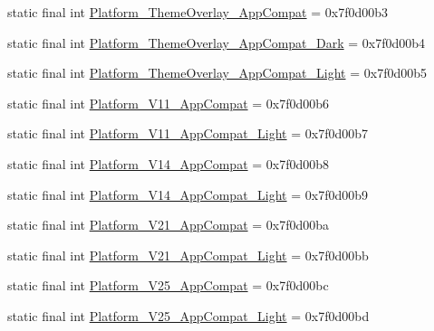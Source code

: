 \begin{DoxyCompactItemize}
\item 
static final int \mbox{\hyperlink{classandroid_1_1support_1_1v7_1_1appcompat_1_1R_1_1style_ad1eaa7488679a38de1c1d644df0440b0}{Platform\+\_\+\+Theme\+Overlay\+\_\+\+App\+Compat}} = 0x7f0d00b3
\item 
static final int \mbox{\hyperlink{classandroid_1_1support_1_1v7_1_1appcompat_1_1R_1_1style_ad5eb2d3e6c0cba3c609b9381e2ac06bd}{Platform\+\_\+\+Theme\+Overlay\+\_\+\+App\+Compat\+\_\+\+Dark}} = 0x7f0d00b4
\item 
static final int \mbox{\hyperlink{classandroid_1_1support_1_1v7_1_1appcompat_1_1R_1_1style_abb38710dc94d78d16e3fa6ccdf5cffd2}{Platform\+\_\+\+Theme\+Overlay\+\_\+\+App\+Compat\+\_\+\+Light}} = 0x7f0d00b5
\item 
static final int \mbox{\hyperlink{classandroid_1_1support_1_1v7_1_1appcompat_1_1R_1_1style_a17a08ee3162e9faa58e649059b4450f7}{Platform\+\_\+\+V11\+\_\+\+App\+Compat}} = 0x7f0d00b6
\item 
static final int \mbox{\hyperlink{classandroid_1_1support_1_1v7_1_1appcompat_1_1R_1_1style_a3c79540d08a593db0383a9495add07be}{Platform\+\_\+\+V11\+\_\+\+App\+Compat\+\_\+\+Light}} = 0x7f0d00b7
\item 
static final int \mbox{\hyperlink{classandroid_1_1support_1_1v7_1_1appcompat_1_1R_1_1style_acec409d7e0da5725a0c1304ea98203d9}{Platform\+\_\+\+V14\+\_\+\+App\+Compat}} = 0x7f0d00b8
\item 
static final int \mbox{\hyperlink{classandroid_1_1support_1_1v7_1_1appcompat_1_1R_1_1style_aa6d2e907602870913732bb0e8bd831e6}{Platform\+\_\+\+V14\+\_\+\+App\+Compat\+\_\+\+Light}} = 0x7f0d00b9
\item 
static final int \mbox{\hyperlink{classandroid_1_1support_1_1v7_1_1appcompat_1_1R_1_1style_afa7b7e0d0bda02929a648dc25449126e}{Platform\+\_\+\+V21\+\_\+\+App\+Compat}} = 0x7f0d00ba
\item 
static final int \mbox{\hyperlink{classandroid_1_1support_1_1v7_1_1appcompat_1_1R_1_1style_a272dadfad222068ee05d9945e4697c3f}{Platform\+\_\+\+V21\+\_\+\+App\+Compat\+\_\+\+Light}} = 0x7f0d00bb
\item 
static final int \mbox{\hyperlink{classandroid_1_1support_1_1v7_1_1appcompat_1_1R_1_1style_a6349d5fc2b57d178192a7037760c9b8e}{Platform\+\_\+\+V25\+\_\+\+App\+Compat}} = 0x7f0d00bc
\item 
static final int \mbox{\hyperlink{classandroid_1_1support_1_1v7_1_1appcompat_1_1R_1_1style_a347dfbadb2696828a7d6bc7e3212114c}{Platform\+\_\+\+V25\+\_\+\+App\+Compat\+\_\+\+Light}} = 0x7f0d00bd

\end{DoxyCompactItemize}
